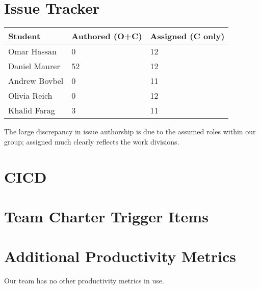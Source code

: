\documentclass{article}
\begin{document}
\section{Issue Tracker}
\iffalse
\wss{For each team member how many issues have they authored (including open and
closed issues (O+C)) and how many have they been assigned (only counting closed
issues (C only)) over the time period of interest.}
\fi
\begin{table}[H]
\centering
\begin{tabular}{lll}
\toprule
\textbf{Student} & \textbf{Authored (O+C)} & \textbf{Assigned (C only)}\\
\midrule
Omar Hassan & 0 & 12\\
Daniel Maurer & 52 & 12\\
Andrew Bovbel & 0 & 11\\
Olivia Reich & 0 & 12\\
Khalid Farag & 3 & 11\\
\bottomrule
\end{tabular}
\end{table}

The large discrepancy in issue authorship is due to the assumed roles within our group; assigned much clearly reflects
the work divisions.

\section{CICD}


\section{Team Charter Trigger Items}




\section{Additional Productivity Metrics}

Our team has no other productivity metrics in use.
\end{document}
